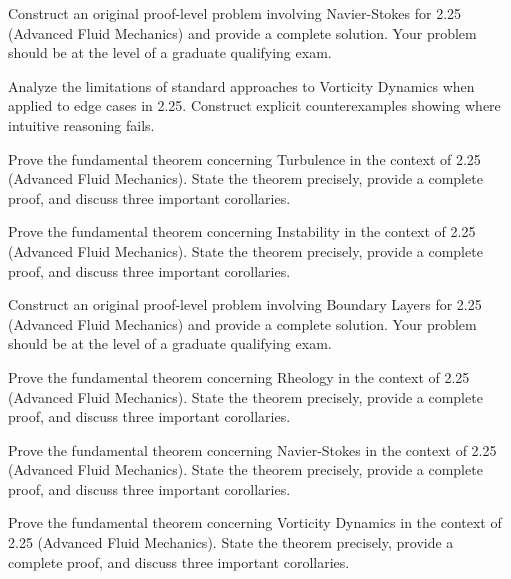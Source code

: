 \documentclass[12pt,a4paper]{exam}
\begin{document}
\begin{questions}

\question[5]
Construct an original proof-level problem involving Navier-Stokes for 2.25 (Advanced Fluid Mechanics) and provide a complete solution. Your problem should be at the level of a graduate qualifying exam.

\vspace{0.3cm}

\question[3]
Analyze the limitations of standard approaches to Vorticity Dynamics when applied to edge cases in 2.25. Construct explicit counterexamples showing where intuitive reasoning fails.

\vspace{0.3cm}

\question[4]
Prove the fundamental theorem concerning Turbulence in the context of 2.25 (Advanced Fluid Mechanics). State the theorem precisely, provide a complete proof, and discuss three important corollaries.

\vspace{0.3cm}

\question[8]
Prove the fundamental theorem concerning Instability in the context of 2.25 (Advanced Fluid Mechanics). State the theorem precisely, provide a complete proof, and discuss three important corollaries.

\vspace{0.3cm}

\question[4]
Construct an original proof-level problem involving Boundary Layers for 2.25 (Advanced Fluid Mechanics) and provide a complete solution. Your problem should be at the level of a graduate qualifying exam.

\vspace{0.3cm}

\question[4]
Prove the fundamental theorem concerning Rheology in the context of 2.25 (Advanced Fluid Mechanics). State the theorem precisely, provide a complete proof, and discuss three important corollaries.

\vspace{0.3cm}

\question[3]
Prove the fundamental theorem concerning Navier-Stokes in the context of 2.25 (Advanced Fluid Mechanics). State the theorem precisely, provide a complete proof, and discuss three important corollaries.

\vspace{0.3cm}

\question[3]
Prove the fundamental theorem concerning Vorticity Dynamics in the context of 2.25 (Advanced Fluid Mechanics). State the theorem precisely, provide a complete proof, and discuss three important corollaries.


\end{questions}
\end{document}
